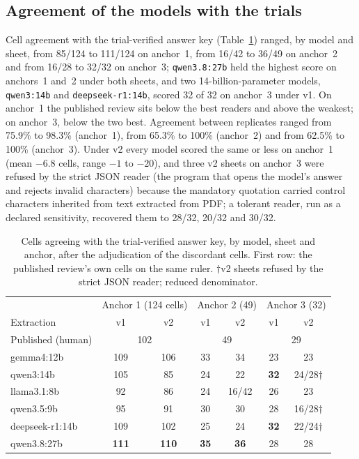 \documentclass[11pt]{article}
\begin{document}
\subsection{Agreement of the models with the trials}
Cell agreement with the trial-verified answer key (Table~\ref{tab:cells}) ranged, by model and sheet, from 85/124 to 111/124 on anchor~1, from 16/42 to 36/49 on anchor~2 and from 16/28 to 32/32 on anchor~3; \texttt{qwen3.8:27b} held the highest score on anchors~1 and~2 under both sheets, and two 14-billion-parameter models, \texttt{qwen3:14b} and \texttt{deepseek-r1:14b}, scored 32 of 32 on anchor~3 under v1. On anchor~1 the published review sits below the best readers and above the weakest; on anchor~3, below the two best. Agreement between replicates ranged from 75.9\% to 98.3\% (anchor~1), from 65.3\% to 100\% (anchor~2) and from 62.5\% to 100\% (anchor~3). Under v2 every model scored the same or less on anchor~1 (mean $-6.8$ cells, range $-1$ to $-20$), and three v2 sheets on anchor~3 were refused by the strict JSON reader (the program that opens the model's answer and rejects invalid characters) because the mandatory quotation carried control characters inherited from text extracted from PDF; a tolerant reader, run as a declared sensitivity, recovered them to 28/32, 20/32 and 30/32.

\begin{table}[!htbp]
\centering\small
\caption{Cells agreeing with the trial-verified answer key, by model, sheet and anchor, after the adjudication of the discordant cells. First row: the published review's own cells on the same ruler. $\dagger$v2 sheets refused by the strict JSON reader; reduced denominator.}
\label{tab:cells}
\setlength{\tabcolsep}{5pt}
\begin{tabular}{lcccccc}
\toprule
& \multicolumn{2}{c}{Anchor 1 (124 cells)} & \multicolumn{2}{c}{Anchor 2 (49)} & \multicolumn{2}{c}{Anchor 3 (32)} \\
Extraction & v1 & v2 & v1 & v2 & v1 & v2 \\
\midrule
Published (human) & \multicolumn{2}{c}{102} & \multicolumn{2}{c}{49} & \multicolumn{2}{c}{29} \\
\midrule
gemma4:12b & 109 & 106 & 33 & 34 & 23 & 23 \\
qwen3:14b & 105 & 85 & 24 & 22 & \textbf{32} & 24/28$\dagger$ \\
llama3.1:8b & 92 & 86 & 24 & 16/42 & 26 & 23 \\
qwen3.5:9b & 95 & 91 & 30 & 30 & 28 & 16/28$\dagger$ \\
deepseek-r1:14b & 109 & 102 & 25 & 24 & \textbf{32} & 22/24$\dagger$ \\
qwen3.8:27b & \textbf{111} & \textbf{110} & \textbf{35} & \textbf{36} & 28 & 28 \\
\bottomrule
\end{tabular}
\end{table}
\end{document}
